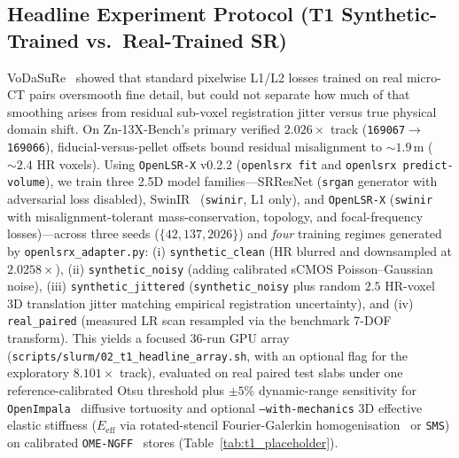 \documentclass[10pt]{article}
\begin{document}
\subsection{Headline Experiment Protocol (T1 Synthetic-Trained vs.\ Real-Trained SR)}
VoDaSuRe~\cite{hoeg2026vodasure} showed that standard pixelwise L1/L2 losses trained on real micro-CT pairs oversmooth fine detail, but could not separate how much of that smoothing arises from residual sub-voxel registration jitter versus true physical domain shift. On Zn-13X-Bench's primary verified $2.026\times$ track (\texttt{169067}$\to$\texttt{169066}), fiducial-versus-pellet offsets bound residual misalignment to $\sim 1.9$\,\textmu m ($\sim 2.4$ HR voxels). Using \texttt{OpenLSR-X} v0.2.2 (\texttt{openlsrx fit} and \texttt{openlsrx predict-volume}), we train three 2.5D model families---SRResNet (\texttt{srgan} generator with adversarial loss disabled), SwinIR~\cite{liang2021swinir} (\texttt{swinir}, L1 only), and \texttt{OpenLSR-X} (\texttt{swinir} with misalignment-tolerant mass-conservation, topology, and focal-frequency losses)---across three seeds ($\{42, 137, 2026\}$) and \emph{four} training regimes generated by \texttt{openlsrx\_adapter.py}: (i) \texttt{synthetic\_clean} (HR blurred and downsampled at $2.0258\times$), (ii) \texttt{synthetic\_noisy} (adding calibrated sCMOS Poisson--Gaussian noise), (iii) \texttt{synthetic\_jittered} (\texttt{synthetic\_noisy} plus random $2.5$ HR-voxel 3D translation jitter matching empirical registration uncertainty), and (iv) \texttt{real\_paired} (measured LR scan resampled via the benchmark 7-DOF transform). This yields a focused 36-run GPU array (\texttt{scripts/slurm/02\_t1\_headline\_array.sh}, with an optional flag for the exploratory $8.101\times$ track), evaluated on real paired test slabs under one reference-calibrated Otsu threshold plus $\pm 5\%$ dynamic-range sensitivity for \texttt{OpenImpala}~\cite{lehoux2021openimpala,lehoux2023diffusivity} diffusive tortuosity and optional \texttt{--with-mechanics} 3D effective elastic stiffness ($E_{\mathrm{eff}}$ via rotated-stencil Fourier-Galerkin homogenisation~\cite{willot2015fourier} or \texttt{SMS}) on calibrated \texttt{OME-NGFF}~\cite{moore2021omenext} stores (Table~\ref{tab:t1_placeholder}).
\end{document}
